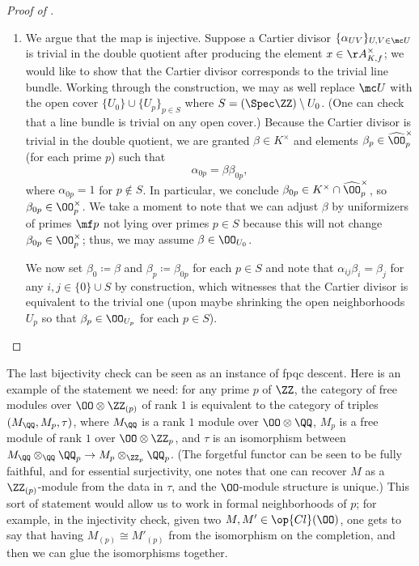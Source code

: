 \documentclass[../notes.tex]{subfiles}
\begin{document}
\begin{proof}[Proof of ]
\begin{enumerate}
		We are now ready to construct our Cartier divisor. The index set for our open cover will be $I\coloneqq\{0\}\cup S$, where $U_0=(\Spec\ZZ)\setminus S$, and $U_p$ is an open neighborhood of $p$ chosen small enough so that $x_p\in\OO_{U_0}^\times$. Now, we define $x_0\coloneqq1$ and define
		\[\alpha_{ij}\coloneqq x_jx_i^{-1}\]
		for any $i,j\in S$. Then the tuple $\{\alpha_{ij}\}_{i,j\in I}$ satisfies the cocycle condition and maps to $x$ by construction, so we are done.

		\item We argue that the map is injective. Suppose a Cartier divisor $\{\alpha_{UV}\}_{U,V\in\mc U}$ is trivial in the double quotient after producing the element $x\in\AA_{K,f}^\times$; we would like to show that the Cartier divisor corresponds to the trivial line bundle. Working through the construction, we may as well replace $\mc U$ with the open cover $\{U_0\}\cup\{U_p\}_{p\in S}$ where $S=(\Spec\ZZ)\setminus U_0$. (One can check that a line bundle is trivial on any open cover.) Because the Cartier divisor is trivial in the double quotient, we are granted $\beta\in K^\times$ and elements $\beta_p\in\widehat\OO_p^\times$ (for each prime $p$) such that
		\[\alpha_{0p}=\beta\beta_{0p},\]
		where $\alpha_{0p}=1$ for $p\notin S$. In particular, we conclude $\beta_{0p}\in K^\times\cap\widehat\OO_{p}^\times$, so $\beta_{0p}\in \OO_p^\times$. We take a moment to note that we can adjust $\beta$ by uniformizers of primes $\mf p$ not lying over primes $p\in S$ because this will not change $\beta_{0p}\in\OO_p^\times$; thus, we may assume $\beta\in\OO_{U_0}$.
		
		We now set $\beta_0\coloneqq\beta$ and $\beta_p\coloneqq\beta_{0p}$ for each $p\in S$ and note that $\alpha_{ij}\beta_i=\beta_j$ for any $i,j\in\{0\}\cup S$ by construction, which witnesses that the Cartier divisor is equivalent to the trivial one (upon maybe shrinking the open neighborhoods $U_p$ so that $\beta_p\in\OO_{U_p}$ for each $p\in S$).
		\qedhere
	\end{enumerate}
\end{proof}
\begin{remark}
	The last bijectivity check can be seen as an instance of fpqc descent. Here is an example of the statement we need: for any prime $p$ of $\ZZ$, the category of free modules over $\OO\otimes\ZZ_{(p)}$ of rank $1$ is equivalent to the category of triples $(M_\QQ,M_p,\tau)$, where $M_\QQ$ is a rank $1$ module over $\OO\otimes\QQ$, $M_p$ is a free module of rank $1$ over $\OO\otimes\ZZ_p$, and $\tau$ is an isomorphism between $M_\QQ\otimes_\QQ\QQ_p\to M_p\otimes_{\ZZ_p}\QQ_p$. (The forgetful functor can be seen to be fully faithful, and for essential surjectivity, one notes that one can recover $M$ as a $\ZZ_{(p)}$-module from the data in $\tau$, and the $\OO$-module structure is unique.) This sort of statement would allow us to work in formal neighborhoods of $p$; for example, in the injectivity check, given two $M,M'\in\op{Cl}(\OO)$, one gets to say that having $M_{(p)}\cong M'_{(p)}$ from the isomorphism on the completion, and then we can glue the isomorphisms together.
\end{remark}
\end{document}
